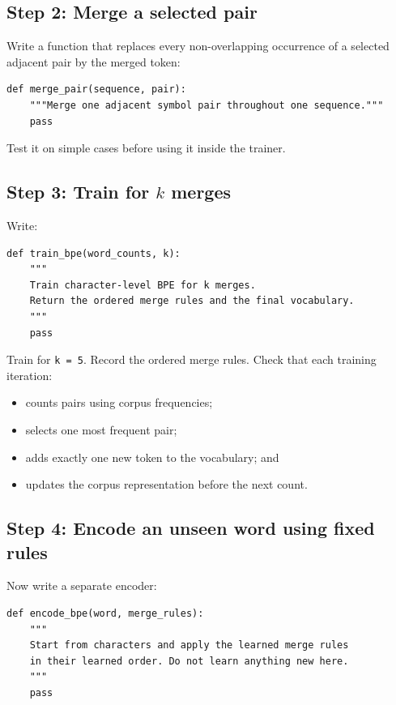 \documentclass[11pt,a4paper]{article}
\begin{document}
\subsection{Step 2: Merge a selected pair}

Write a function that replaces every non-overlapping occurrence of a selected adjacent pair by the merged token:

\begin{lstlisting}
def merge_pair(sequence, pair):
    """Merge one adjacent symbol pair throughout one sequence."""
    pass
\end{lstlisting}

Test it on simple cases before using it inside the trainer.

\subsection{Step 3: Train for \texorpdfstring{$k$}{k} merges}

Write:

\begin{lstlisting}
def train_bpe(word_counts, k):
    """
    Train character-level BPE for k merges.
    Return the ordered merge rules and the final vocabulary.
    """
    pass
\end{lstlisting}

Train for \texttt{k = 5}. Record the ordered merge rules. Check that each training iteration:

\begin{itemize}
  \item counts pairs using corpus frequencies;
  \item selects one most frequent pair;
  \item adds exactly one new token to the vocabulary; and
  \item updates the corpus representation before the next count.
\end{itemize}

\subsection{Step 4: Encode an unseen word using fixed rules}

Now write a separate encoder:

\begin{lstlisting}
def encode_bpe(word, merge_rules):
    """
    Start from characters and apply the learned merge rules
    in their learned order. Do not learn anything new here.
    """
    pass
\end{lstlisting}
\end{document}
